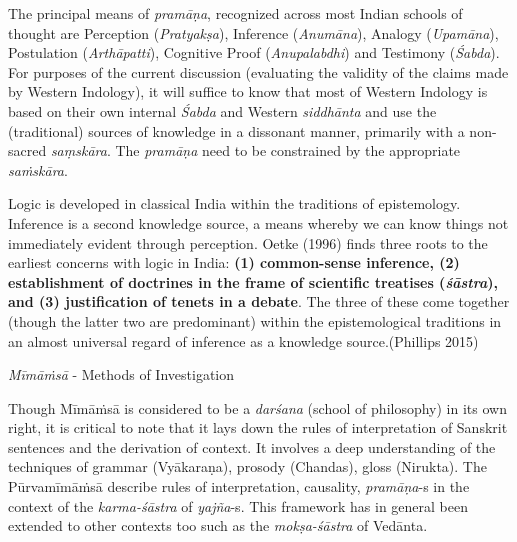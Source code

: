The principal means of {\sl pramāṇa}, recognized across most Indian schools of thought are Perception ({\sl Pratyakṣa}), Inference ({\sl Anumāna}), Analogy ({\sl Upamāna}), Postulation ({\sl Arthāpatti}), Cognitive Proof ({\sl Anupalabdhi}) and Testimony ({\sl Śabda}). For purposes of the current discussion (evaluating the validity of the claims made by Western Indology), it will suffice to know that most of Western Indology is based on their own internal {\sl Śabda} and Western {\sl siddhānta} and use the (traditional) sources of knowledge in a dissonant manner,  primarily with a non-sacred {\sl saṃ\-skāra}. The {\sl pramāṇa} need to be constrained by the appropriate {\sl saṁskāra}.
\begin{myquote}
Logic is developed in classical India within the traditions of epistemology. Inference is a second knowledge source, a means whereby we can know things not immediately evident through perception. Oetke (1996) finds three roots to the earliest concerns with logic in India: {\bf (1) common-sense inference, (2) establishment of doctrines in the frame of scientific treatises ({{\sl\bfseries śāstra}\relax}), and (3) justification of tenets in a debate}. The three of these come together (though the latter two are predominant) within the epistemological traditions in an almost universal regard of inference as a knowledge source.\hfill (Phillips 2015)
\end{myquote}

\newpage

{\sl Mīmāṁsā} - Methods of Investigation

Though Mīmāṁsā is considered to be a {\sl darśana} (school of philosophy) in its own right, it is critical to note that it lays down the rules of interpretation of Sanskrit sentences and the derivation of context. It involves a deep understanding of the techniques of grammar (Vyākaraṇa), prosody (Chandas), gloss (Nirukta). The Pūrvamīmāṁsā describe rules of interpretation, causality, {\sl pramāṇa}-s in the context of the {\sl karma-śāstra} of {\sl yajña}-s. This framework has in general been extended to other contexts too such as the {\sl mokṣa-śāstra} of Vedānta.

